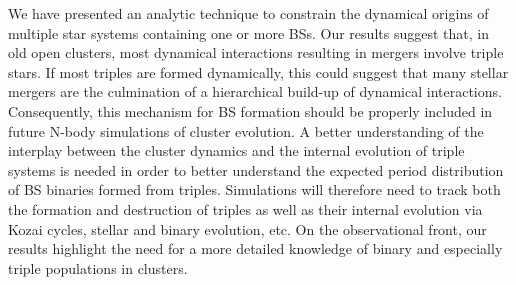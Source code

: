 We have presented an analytic technique to constrain the dynamical
origins of multiple star systems containing one or more BSs.  Our
results suggest that, in old open clusters, most dynamical
interactions resulting in mergers involve triple stars.  If most
triples are formed dynamically, this could suggest that
many stellar mergers are the culmination of a hierarchical build-up of
dynamical interactions.  
Consequently, this mechanism for BS formation should 
be properly included in future N-body simulations of cluster
evolution.  A better
understanding of the interplay between the cluster dynamics and the
internal evolution of triple systems is needed in order to better
understand the expected period distribution of BS binaries formed from
triples.  Simulations will therefore need to
track both the formation 
and destruction of triples as well as their internal evolution via
Kozai cycles, stellar and binary evolution, etc.  On the observational
front, our results highlight the need for a more detailed knowledge of
binary and especially triple populations in clusters. 



